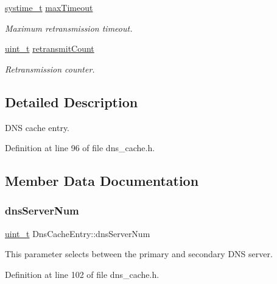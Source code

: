 \begin{DoxyCompactItemize}
\hyperlink{compiler__port_8h_ae3e32a98d431a02106616da3071832dd}{systime\+\_\+t} \hyperlink{structDnsCacheEntry_a4167197fb96cd19e4efdcd25184749c1}{max\+Timeout}
\begin{DoxyCompactList}\small\item\em Maximum retransmission timeout. \end{DoxyCompactList}\item 
\hyperlink{compiler__port_8h_a12a1e9b3ce141648783a82445d02b58d}{uint\+\_\+t} \hyperlink{structDnsCacheEntry_aa1813da7ebe162f069a6079aa2365db1}{retransmit\+Count}
\begin{DoxyCompactList}\small\item\em Retransmission counter. \end{DoxyCompactList}\end{DoxyCompactItemize}


\subsection{Detailed Description}
D\+NS cache entry. 

Definition at line 96 of file dns\+\_\+cache.\+h.



\subsection{Member Data Documentation}
\mbox{\label{structDnsCacheEntry_a64c746516176b9ecc93492623e951a5c}} 
\subsubsection{\texorpdfstring{dns\+Server\+Num}{dnsServerNum}}
{\footnotesize\ttfamily \hyperlink{compiler__port_8h_a12a1e9b3ce141648783a82445d02b58d}{uint\+\_\+t} Dns\+Cache\+Entry\+::dns\+Server\+Num}



This parameter selects between the primary and secondary D\+NS server. 



Definition at line 102 of file dns\+\_\+cache.\+h.

\mbox{\label{structDnsCacheEntry_ab32547b4942b2db0f0c0bcb41458856d}} 
